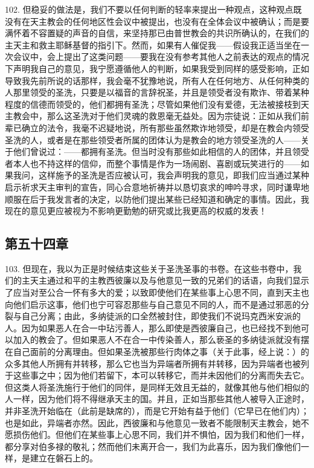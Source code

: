 102. 但稳妥的做法是，我们不要以任何判断的轻率来提出一种观点，这种观点既没有在天主教会的任何地区性会议中被提出，也没有在全体会议中被确认；而是要满怀着不容置疑的声音的自信，来坚持那已由普世教会的共识所确认的，在我们的主天主和救主耶稣基督的指引下。然而，如果有人催促我——假设我正适当坐在一次会议中，会上提出了这类问题——要我在没有参考其他人之前表达的观点的情况下声明我自己的意见，我宁愿遵循他人的判断，如果我受到同样的感受影响，正如导致我先前所说的话那样，我会毫不犹豫地说，所有人在任何地方、从任何种类的人那里领受的圣洗，只要是以福音的言辞祝圣，并且是领受者没有欺诈、带着某种程度的信德而领受的，他们都拥有圣洗；尽管如果他们没有爱德，无法被接枝到天主教会中，那么这圣洗对于他们灵魂的救恩毫无益处。因为宗徒说：正如从我们前辈已确立的法令，我毫不迟疑地说，所有那些虽然欺诈地领受，却是在教会内领受圣洗的人，或者是在那些领受者所属的团体认为是教会的地方领受圣洗的人——关于他们曾说过：——都拥有圣洗。但当时没有那些如此相信的人的团体，并且领受者本人也不持这样的信仰，而整个事情是作为一场闹剧、喜剧或玩笑进行的——如果我问，这样施予的圣洗是否应被认可，我会声明我的意见，即我们应当通过某种启示祈求天主审判的宣告，同心合意地祈祷并以恳切哀求的呻吟寻求，同时谦卑地顺服在后于我发言者的决定，以防他们提出某些已经知道和确定的事情。因此，我现在的意见更应被视为不影响更勤勉的研究或比我更高的权威的发表！\par


\subsection{第五十四章}

103. 但现在，我以为正是时候结束这些关于圣洗圣事的书卷。在这些书卷中，我们的主天主通过和平的主教西彼廉以及与他意见一致的兄弟们的话语，向我们显示了应当对至公合一怀有多大的爱；以致即使他们在某些事上心思不同，直到天主也向他们启示这事，他们也宁可容忍那些与自己意见不同的人，而不是通过邪恶的分裂与自己分离；由此，多纳徒派的口全然被封住，即使我们不说玛克西米安派的人。因为如果恶人在合一中玷污善人，那么即使是西彼廉自己，也已经找不到他可以加入的教会了。但如果恶人不在合一中传染善人，那么亵圣的多纳徒派就没有摆在自己面前的分离理由。但如果圣洗被那些行肉体之事（关于此事，经上说：）的众多其他人所拥有并转移，那么它也当为异端者所拥有并转移，因为异端者也被列于这些事之中；因为他们若留下，本可以转移它，而并未因他们的分离而失去它。但这类人将圣洗施行于他们的同伴，是同样无效且无益的，就像其他与他们相似的人一样，因为他们将不得继承天主的国。并且，正如当那些其他人被导入正途时，并非圣洗开始临在（此前是缺席的），而是它开始有益于他们（它早已在他们内）；也是如此，异端者亦然。因此，西彼廉和与他意见一致者不能限制天主教会，她不愿损伤他们。但他们在某些事上心思不同，我们并不惧怕，因为我们和他们一样，都分享对伯多禄的敬礼；然而他们未离开合一，我们为此喜乐，因为我们像他们一样，是建立在磐石上的。\par

